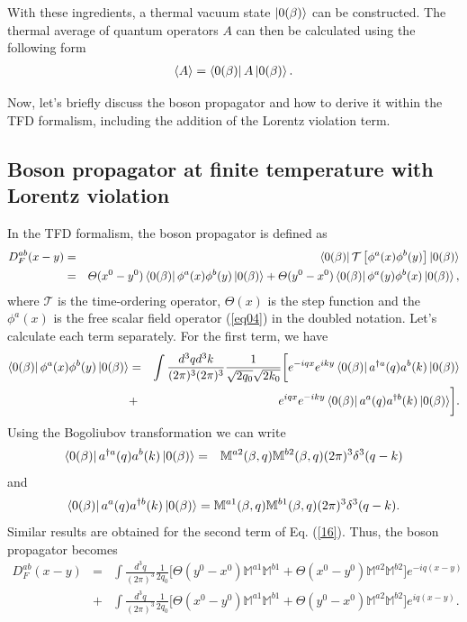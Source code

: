 \documentclass[11pt,showpacs,preprintnumbers,amsmath,amssymb,prd,nofootinbib,superscriptaddress]{revtex4-2}
\begin{document}
With these ingredients, a thermal vacuum state $\ket{0(\beta)}$ can be constructed. The thermal average of quantum operators $A$ can then be calculated using the following form
\begin{eqnarray}
    \langle A\rangle=\bra{0(\beta)}A\ket{0(\beta)}.
\end{eqnarray}

Now, let's briefly discuss the boson propagator and how to derive it within the TFD formalism, including the addition of the Lorentz violation term.


\subsection{Boson propagator at finite temperature with Lorentz violation}\label{secpropagator}

In the TFD formalism, the boson propagator is defined as
\begin{eqnarray}
    D_{F}^{ab}(x-y)&=&\bra{0(\beta)}\mathcal{T}\left[\phi^a(x)\phi^b(y)\right]\ket{0(\beta)}\nonumber\\
    &=&\Theta(x^0-y^0)\bra{0(\beta)}\phi^a(x)\phi^b(y)\ket{0(\beta)}+\Theta(y^0-x^0)\bra{0(\beta)}\phi^a(y)\phi^b(x)\ket{0(\beta)},\label{16}
\end{eqnarray}
where $\mathcal{T}$ is the time-ordering operator, $\Theta(x)$ is the step function and the $\phi^a(x)$ is the free scalar field operator (\ref{eq04}) in the doubled notation. Let's calculate each term separately. For the first term, we have
\begin{eqnarray}
\bra{0(\beta)}\phi^a(x)\phi^b(y)\ket{0(\beta)}&=&\int\frac{d^3qd^3k}{(2\pi)^3(2\pi)^3}\frac{1}{\sqrt{2q_0}\sqrt{2k_0}}\biggl[e^{-i q x}e^{ik y}\bra{0(\beta)}a^{\dagger a}(q)a^{b}(k)\ket{0(\beta)}\nonumber\\
&+&e^{i q x}e^{-ik y}\bra{0(\beta)}a^{a}(q)a^{\dagger b}(k)\ket{0(\beta)}\biggr].\label{eq18}
\end{eqnarray}
Using the Bogoliubov transformation we can write
\begin{eqnarray}
    \bra{0(\beta)}a^{\dagger a}(q)a^{b}(k)\ket{0(\beta)}&=&\mathbb{M}^{a2}(\beta,q)\mathbb{M}^{b2}(\beta,q)(2\pi)^3\delta^3(q-k)
\end{eqnarray}
and
\begin{eqnarray}
    \bra{0(\beta)}a^{a}(q)a^{\dagger b}(k)\ket{0(\beta)}=\mathbb{M}^{a1}(\beta,q)\mathbb{M}^{b1}(\beta,q)(2\pi)^3\delta^3(q-k).
\end{eqnarray}
Similar results are obtained for the second term of Eq. (\ref{16}). Thus, the boson propagator becomes
\begin{eqnarray}
    D^{ab}_F(x-y)&=&\int\frac{d^3q}{(2\pi)^3}\frac{1}{2q_0}\biggl[\Theta(y^0-x^0)\mathbb{M}^{a1}\mathbb{M}^{b1}+\Theta(x^0-y^0)\mathbb{M}^{a2}\mathbb{M}^{b2}\biggr]e^{-iq(x-y)}\nonumber\\
    &+&\int\frac{d^3q}{(2\pi)^3}\frac{1}{2q_0}\biggl[\Theta(x^0-y^0)\mathbb{M}^{a1}\mathbb{M}^{b1}+\Theta(y^0-x^0)\mathbb{M}^{a2}\mathbb{M}^{b2}\biggr]e^{iq(x-y)}.\label{eq02}
\end{eqnarray}
\end{document}
